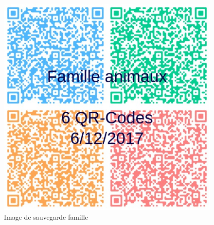 \begin{figure}[h!]
	\centering
   \includegraphics[scale=0.2]{img/animaux.jpeg}
   \caption{Image de sauvegarde famille}
\end{figure}